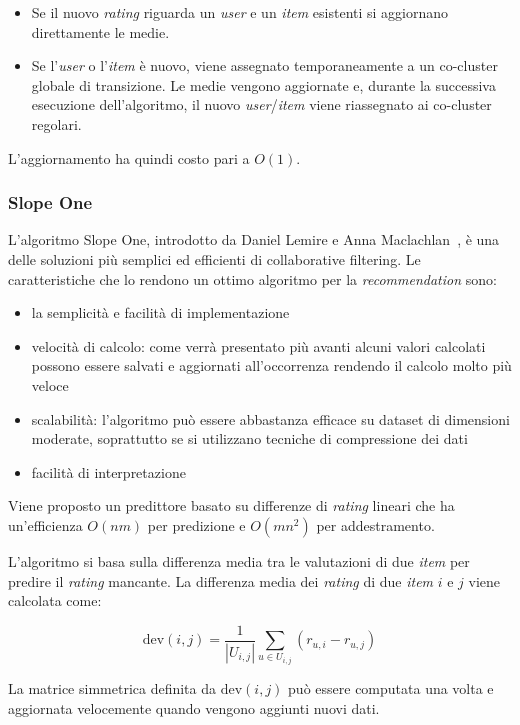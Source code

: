 \begin{itemize}
  \item Se il nuovo \textit{rating} riguarda un \textit{user} e un \textit{item} esistenti si aggiornano direttamente le medie.
  \item Se l'\textit{user} o l'\textit{item} è nuovo, viene assegnato temporaneamente a un co-cluster globale di transizione. Le medie vengono aggiornate e, durante la successiva esecuzione dell'algoritmo, il nuovo \textit{user}/\textit{item} viene riassegnato ai co-cluster regolari.
\end{itemize}

L'aggiornamento ha quindi costo pari a $O(1)$.


\subsubsection{Slope One}\label{slopeone}

L'algoritmo Slope One, introdotto da Daniel Lemire e Anna Maclachlan~\cite{SlopeOne}, è una delle soluzioni più semplici ed efficienti di collaborative filtering.
%
Le caratteristiche che lo rendono un ottimo algoritmo per la \textit{recommendation} sono:
\begin{itemize}
    \item la semplicità e facilità di implementazione
    \item velocità di calcolo: come verrà presentato più avanti alcuni valori calcolati possono essere salvati e aggiornati all'occorrenza rendendo il calcolo molto più veloce
    \item scalabilità: l'algoritmo può essere abbastanza efficace su dataset di dimensioni moderate, soprattutto se si utilizzano tecniche di compressione dei dati
    \item facilità di interpretazione
\end{itemize}
%
Viene proposto un predittore basato su differenze di \textit{rating} lineari che ha un'efficienza $O(nm)$ per predizione e $O(mn^2)$ per addestramento.

L'algoritmo si basa sulla differenza media tra le valutazioni di due \textit{item} per predire il \textit{rating} mancante. La differenza media dei \textit{rating} di due \textit{item} $i$ e $j$ viene calcolata come:

\[
    \text{dev}(i, j) = \frac{1}{|U_{i,j}|} \sum\limits_{u \in U_{i,j}} (r_{u,i} - r_{u,j})
\]

La matrice simmetrica definita da $\text{dev}(i, j)$ può essere computata una volta e aggiornata velocemente quando vengono aggiunti nuovi dati.


